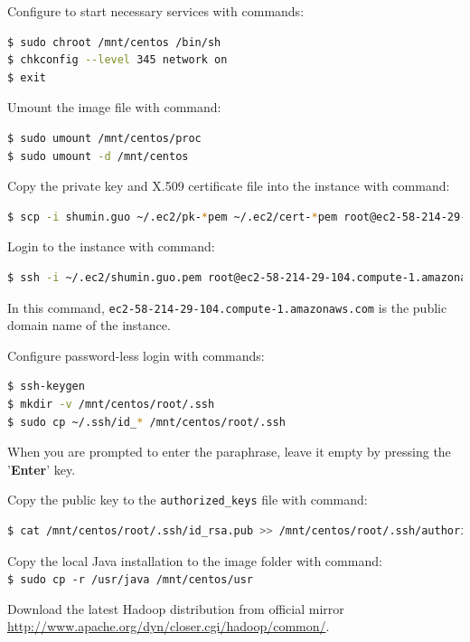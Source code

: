 Configure to start necessary services with commands:
\lstset{style=bashstyle}
\begin{lstlisting}[language=bash]
$ sudo chroot /mnt/centos /bin/sh
$ chkconfig --level 345 network on
$ exit
\end{lstlisting}

Umount the image file with command:
\lstset{style=bashstyle}
\begin{lstlisting}[language=bash]
$ sudo umount /mnt/centos/proc
$ sudo umount -d /mnt/centos
\end{lstlisting}

Copy the private key and X.509 certificate file into the instance with command:
\lstset{style=bashstyle}
\begin{lstlisting}[language=bash]
$ scp -i shumin.guo ~/.ec2/pk-*pem ~/.ec2/cert-*pem root@ec2-58-214-29-104.compute-1.amazonaws.com:~/.ec2/
\end{lstlisting}

Login to the instance with command:
\lstset{style=bashstyle}
\begin{lstlisting}[language=bash]
$ ssh -i ~/.ec2/shumin.guo.pem root@ec2-58-214-29-104.compute-1.amazonaws.com
\end{lstlisting}

In this command, \verb|ec2-58-214-29-104.compute-1.amazonaws.com| is the public domain name of the instance.

Configure password-less login with commands:
\lstset{style=bashstyle}
\begin{lstlisting}[language=bash]
$ ssh-keygen
$ mkdir -v /mnt/centos/root/.ssh
$ sudo cp ~/.ssh/id_* /mnt/centos/root/.ssh
\end{lstlisting}

When you are prompted to enter the paraphrase, leave it empty by pressing the '\textbf{Enter}' key.

Copy the public key to the \verb|authorized_keys| file with command:
\lstset{style=bashstyle}
\begin{lstlisting}[language=bash]
$ cat /mnt/centos/root/.ssh/id_rsa.pub >> /mnt/centos/root/.ssh/authorized_keys
\end{lstlisting}

Copy the local Java installation to the image folder with command: \\
\verb|$ sudo cp -r /usr/java /mnt/centos/usr|

Download the latest Hadoop distribution from official mirror \url{http://www.apache.org/dyn/closer.cgi/hadoop/common/}.

